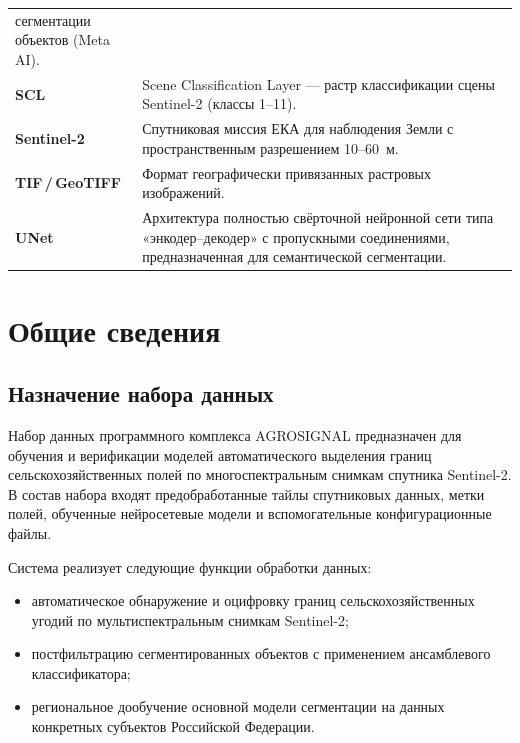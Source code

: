 \documentclass[14pt,a4paper]{extarticle}
\begin{document}
\begin{longtable}{@{}L{30mm}L{120mm}@{}}
                     сегментации объектов (Meta AI). \\[4pt]
\textbf{SCL}       & Scene Classification Layer — растр классификации сцены
                     Sentinel-2 (классы 1--11). \\[4pt]
\textbf{Sentinel-2}& Спутниковая миссия ЕКА для наблюдения Земли с пространственным
                     разрешением 10--60~м. \\[4pt]
\textbf{TIF\,/\,GeoTIFF} & Формат географически привязанных растровых изображений. \\[4pt]
\textbf{UNet}      & Архитектура полностью свёрточной нейронной сети типа
                     «энкодер–декодер» с пропускными соединениями,
                     предназначенная для семантической сегментации. \\
\end{longtable}

\section{Общие сведения}

\subsection{Назначение набора данных}

Набор данных программного комплекса AGROSIGNAL предназначен для обучения
и верификации моделей автоматического выделения границ сельскохозяйственных
полей по многоспектральным снимкам спутника Sentinel-2. В состав набора входят
предобработанные тайлы спутниковых данных, метки полей, обученные нейросетевые
модели и вспомогательные конфигурационные файлы.

Система реализует следующие функции обработки данных:
\begin{itemize}
  \item автоматическое обнаружение и оцифровку границ сельскохозяйственных угодий
        по мультиспектральным снимкам Sentinel-2;
  \item постфильтрацию сегментированных объектов с применением
        ансамблевого классификатора;
  \item региональное дообучение основной модели сегментации на данных
        конкретных субъектов Российской Федерации.
\end{itemize}
\end{document}
